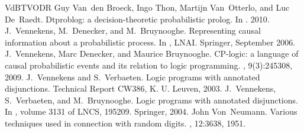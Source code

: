 \documentclass[letterpaper,10pt,english]{sphinxmanual}
\begin{document}
\begin{sphinxthebibliography}{VdBTVODR}
Guy Van den Broeck, Ingo Thon, Martijn Van Otterlo, and Luc De Raedt. Dtproblog: a decision-theoretic probabilistic prolog. In . 2010.
J. Vennekens, M. Denecker, and M. Bruynooghe. Representing causal information about a probabilistic process. In , LNAI. Springer, September 2006.
J. Vennekens, Marc Denecker, and Maurice Bruynooghe. CP-logic: a language of causal probabilistic events and its relation to logic programming. , 9(3):245\textendash{}308, 2009.
J. Vennekens and S. Verbaeten. Logic programs with annotated disjunctions. Technical Report CW386, K. U. Leuven, 2003.
J. Vennekens, S. Verbaeten, and M. Bruynooghe. Logic programs with annotated disjunctions. In , volume 3131 of LNCS, 195\textendash{}209. Springer, 2004.
John Von Neumann. Various techniques used in connection with random digits. , 12:36\textendash{}38, 1951.
\end{sphinxthebibliography}



\renewcommand{\indexname}{Index}
\printindex
\end{document}
